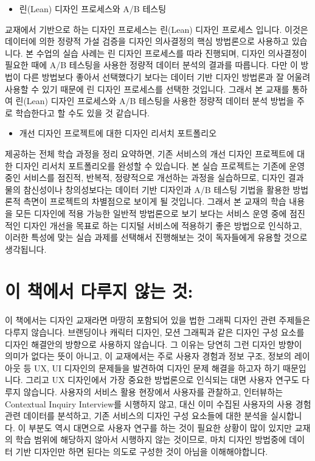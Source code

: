 \documentclass[
  letterpaper,
]{book}
\providecommand{\tightlist}{%
  \setlength{\itemsep}{0pt}\setlength{\parskip}{0pt}}\usepackage{longtable,booktabs,array}
\begin{document}
\begin{itemize}
\tightlist
\item
  린(Lean) 디자인 프로세스와 A/B 테스팅
\end{itemize}

교재에서 기반으로 하는 디자인 프로세스는 린(Lean) 디자인 프로세스
입니다. 이것은 데이터에 의한 정량적 가설 검증을 디자인 의사결정의 핵심
방법론으로 사용하고 있습니다. 본 수업의 실습 사례는 린 디자인 프로세스를
따라 진행되며, 디자인 의사결정이 필요한 때에 A/B 테스팅을 사용한 정량적
데이터 분석의 결과를 따릅니다. 다만 이 방법이 다른 방법보다 좋아서
선택했다기 보다는 데이터 기반 디자인 방법론과 잘 어울려 사용할 수 있기
때문에 린 디자인 프로세스를 선택한 것입니다. 그래서 본 교재를 통하여
린(Lean) 디자인 프로세스와 A/B 테스팅을 사용한 정량적 데이터 분석 방법을
주로 학습한다고 할 수도 있을 것 같습니다.

\begin{itemize}
\tightlist
\item
  개선 디자인 프로젝트에 대한 디자인 리서치 포트폴리오
\end{itemize}

제공하는 전체 학습 과정을 정리 요약하면, 기존 서비스의 개선 디자인
프로젝트에 대한 디자인 리서치 포트폴리오를 완성할 수 있습니다. 본 실습
프로젝트는 기존에 운영 중인 서비스를 점진적, 반복적, 정량적으로 개선하는
과정을 실습하므로, 디자인 결과물의 참신성이나 창의성보다는 데이터 기반
디자인과 A/B 테스팅 기법을 활용한 방법론적 측면이 프로젝트의 차별점으로
보이게 될 것입니다. 그래서 본 교재의 학습 내용을 모든 디자인에 적용
가능한 일반적 방법론으로 보기 보다는 서비스 운영 중에 점진적인 디자인
개선을 목표로 하는 디지털 서비스에 적용하기 좋은 방법으로 인식하고,
이러한 특성에 맞는 실습 과제를 선택해서 진행해보는 것이 독자들에게
유용할 것으로 생각됩니다.

\section*{이 책에서 다루지 않는
것:}\label{uxc774-uxcc45uxc5d0uxc11c-uxb2e4uxb8e8uxc9c0-uxc54auxb294-uxac83}


이 책에서는 디자인 교재라면 마땅히 포함되어 있을 법한 그래픽 디자인 관련
주제들은 다루지 않습니다. 브랜딩이나 캐릭터 디자인, 모션 그래픽과 같은
디자인 구성 요소를 디자인 해결안의 방향으로 사용하지 않습니다. 그 이유는
당연히 그런 디자인 방향이 의미가 없다는 뜻이 아니고, 이 교재에서는 주로
사용자 경험과 정보 구조, 정보의 레이아웃 등 UX, UI 디자인의 문제들을
발견하여 디자인 문제 해결을 하고자 하기 때문입니다. 그리고 UX 디자인에서
가장 중요한 방법론으로 인식되는 대면 사용자 연구도 다루지 않습니다.
사용자의 서비스 활용 현장에서 사용자를 관찰하고, 인터뷰하는 Contextual
Inquiry Interview를 시행하지 않고, 대신 이미 수집된 사용자의 사용 경험
관련 데이터를 분석하고, 기존 서비스의 디자인 구성 요소들에 대한 분석을
실시합니다. 이 부분도 역시 대면으로 사용자 연구를 하는 것이 필요한
상황이 많이 있지만 교재의 학습 범위에 해당하지 않아서 시행하지 않는
것이므로, 마치 디자인 방법중에 데이터 기반 디자인만 하면 된다는 의도로
구성한 것이 아님을 이해해야합니다.
\end{document}
